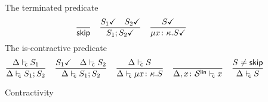 \begin{figure}[tp]
  The terminated predicate \hfill{}
  \begin{equation*}
    \frac{}{\mathsf{skip}}
    \quad
    \frac{
      {S_1}\checkmark
      \quad
      {S_2}\checkmark
    }{
      {S_1;S_2}\checkmark
    }
    \quad
    \frac{
      {S}\checkmark
    }{
      {\mu{x\colon\kappa}.{S}}\checkmark
}
  \end{equation*}
  The is-contractive predicate \hfill{}
  \begin{equation*}
    \frac{
      \isContr{S_1}
    }{
      \isContr{S_1;S_2}
    }
    \quad
    \frac{
      \isDone{S_1}
      \quad
      \isContr{S_2}
    }{
      \isContr{S_1;S_2}
    }
    \quad
    \frac{
      \isContr S
    }{
      \isContr{\rect{x\colon\kind}S}
    }
    \quad
    \frac{}{
      \isContr[\Delta,x\colon\kindk\kinds\link] x
    }
    \quad
    \frac{
      S\neq\skipt
    }{
      \isContr S
    }
  \end{equation*}
  \caption{Contractivity}
  \label{fig:contractivity}
\end{figure}

